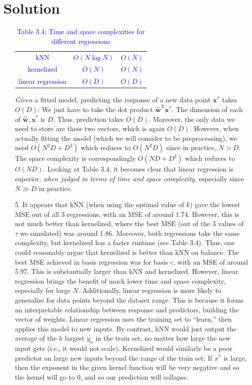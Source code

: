 \documentclass[submit]{../harvardml}
\newenvironment{solution}
  {\color{blue}\section*{Solution}}
{}
\begin{document}
\begin{solution}
\begin{enumerate}
\begin{table}[H]
\begin{tabular}{|c|c|c|}
                \hline
                \textcolor{blue}{kNN} & \textcolor{blue}{$O(N\log N)$} & \textcolor{blue}{$O(N)$} \\ 
                \textcolor{blue}{kernelized} & \textcolor{blue}{$O(N)$} & \textcolor{blue}{$O(N)$} \\ 
                \textcolor{blue}{linear regression} & \textcolor{blue}{$O(D)$} & \textcolor{blue}{$O(D)$} \\ 
                \hline
            \end{tabular}
            \caption*{\textcolor{blue}{Table 3.4: Time and space complexities for different regressions}}
            \label{tab:knn_kernel}
        \end{table}
    \textit{Given} a fitted model, predicting the response of a new data point $\mathbf{x^*}$ takes $O(D)$: We just have to take the dot product $\mathbf{\hat{w}}^\mathrm{T}\mathbf{x^*}$. The dimension of each of $\mathbf{\hat{w}}, \mathbf{x^*}$ is $D$. Thus, prediction takes $O(D)$. Moreover, the only data we need to store are these two vectors, which is again $O(D)$. However, when actually fitting the model (which we will consider to be preprocessing), we need $O\left(N^2D + D^3\right)$ which reduces to $O\left(N^2D\right)$ since in practice, $N > D$. The space complexity is correspondingly $O\left(ND +D^2\right)$ which reduces to $O\left(ND\right)$.
    \newline \newline
    Looking at Table 3.4, it becomes clear that linear regression is superior, \textit{when judged in terms of time and space complexity}, especially since $N \gg D$ in practice.
    \item[5.] It appears that kNN (when using the optimal value of $k$) gave the lowest MSE out of all 3 regressions, with an MSE of around 1.74. However, this is not much better than kernelized, where the best MSE (out of the 3 values of $\tau$ we simulated) was around 1.86. Moreover, both regressions take the same complexity, but kernelized has a faster runtime (see Table 3.4). Thus, one could reasonably argue that kernelized is better than kNN on balance. 
    \newline \newline
    The best MSE achieved in basis regression was for basis c, with an MSE of around 5.97. This is substantially larger than kNN and kernelized. However, linear regression brings the benefit of much lower time and space complexity, especially for large $N$. Additionally, linear regression is more likely to generalize for data points beyond the dataset range. This is because it forms an interpretable relationship between response and predictors, building the vector of weights. Linear regression uses the training set to ``learn,'' then applies this model to new inputs. By contrast, kNN would just output the average of the $k$ largest $y_n$ in the train set, no matter how large the new input gets (i.e., it would not scale). Kernelized would similarly be a poor predictor on large new inputs beyond the range of the train set: If $x^*$ is large, then the exponent in the given kernel function will be very negative and so the kernel will go to 0, and so our prediction will collapse.

\end{enumerate}
\end{solution}
\end{document}
